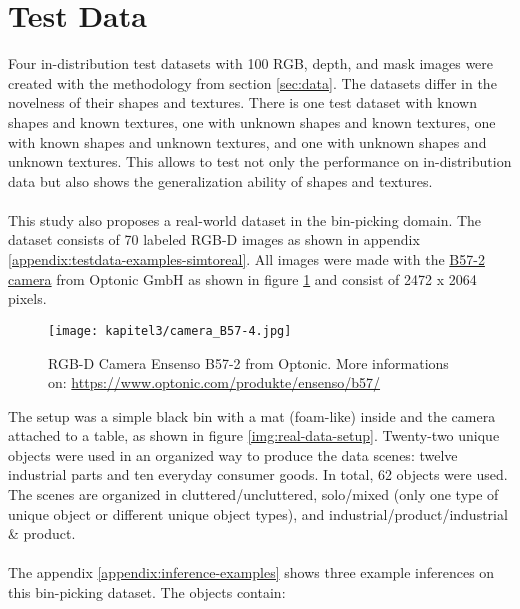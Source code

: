 	\section{Test Data}
	\label{sec:test-data}
		Four in-distribution test datasets with 100 RGB, depth, and mask images were created with the methodology from section \ref{sec:data}.
		The datasets differ in the novelness of their shapes and textures. There is one test dataset with known shapes and known textures, one with unknown shapes and known textures, one with known shapes and unknown textures, and one with unknown shapes and unknown textures. This allows to test not only the performance on in-distribution data but also shows the generalization ability of shapes and textures.\\
		\\
		This study also proposes a real-world dataset in the bin-picking domain. The dataset consists of 70 labeled RGB-D images as shown in appendix \ref{appendix:testdata-examples-simtoreal}. All images were made with the \href{https://www.optonic.com/produkte/ensenso/b57/}{B57-2 camera} from Optonic GmbH \cite{optonic} as shown in figure \ref{img:camera} and consist of 2472 x 2064 pixels.
		\begin{figure}[h]
			\centering
			\texttt{[image: kapitel3/camera\_B57-4.jpg]}
			\caption[RGB-D Camera Ensenso B57-2 from Optonic. More informations on: \url{https://www.optonic.com/produkte/ensenso/b57/}]{RGB-D Camera Ensenso B57-2 from Optonic. More informations on: \url{https://www.optonic.com/produkte/ensenso/b57/}}
			\label{img:camera}
		\end{figure}
		\FloatBarrier
		The setup was a simple black bin with a mat (foam-like) inside and the camera attached to a table, as shown in figure \ref{img:real-data-setup}.
		Twenty-two unique objects were used in an organized way to produce the data scenes: twelve industrial parts and ten everyday consumer goods. In total, 62 objects were used. The scenes are organized in cluttered/uncluttered, solo/mixed (only one type of unique object or different unique object types), and industrial/product/industrial \& product.\\
		\\
		The appendix \ref{appendix:inference-examples} shows three example inferences on this bin-picking dataset.
		\clearpage
		The objects contain:
